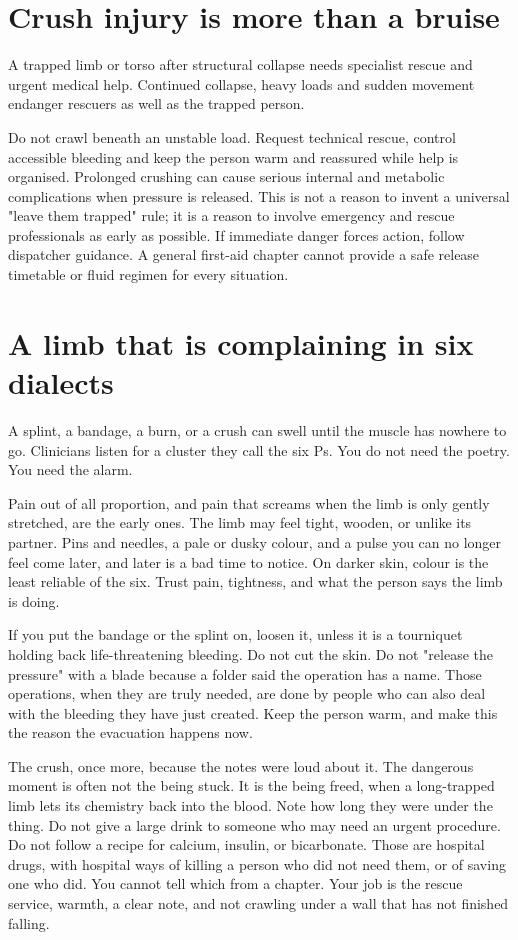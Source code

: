 \documentclass[10pt,openright]{book}
\begin{document}
\section*{Crush injury is more than a bruise}
A trapped limb or torso after structural collapse needs specialist rescue and urgent medical help. Continued collapse, heavy loads and sudden movement endanger rescuers as well as the trapped person.

Do not crawl beneath an unstable load. Request technical rescue, control accessible bleeding and keep the person warm and reassured while help is organised. Prolonged crushing can cause serious internal and metabolic complications when pressure is released. This is not a reason to invent a universal "leave them trapped" rule; it is a reason to involve emergency and rescue professionals as early as possible. If immediate danger forces action, follow dispatcher guidance. A general first-aid chapter cannot provide a safe release timetable or fluid regimen for every situation.

\section*{A limb that is complaining in six dialects}
A splint, a bandage, a burn, or a crush can swell until the muscle has nowhere to go. Clinicians listen for a cluster they call the six Ps. You do not need the poetry. You need the alarm.

Pain out of all proportion, and pain that screams when the limb is only gently stretched, are the early ones. The limb may feel tight, wooden, or unlike its partner. Pins and needles, a pale or dusky colour, and a pulse you can no longer feel come later, and later is a bad time to notice. On darker skin, colour is the least reliable of the six. Trust pain, tightness, and what the person says the limb is doing.

If you put the bandage or the splint on, loosen it, unless it is a tourniquet holding back life-threatening bleeding. Do not cut the skin. Do not "release the pressure" with a blade because a folder said the operation has a name. Those operations, when they are truly needed, are done by people who can also deal with the bleeding they have just created. Keep the person warm, and make this the reason the evacuation happens now.

The crush, once more, because the notes were loud about it. The dangerous moment is often not the being stuck. It is the being freed, when a long-trapped limb lets its chemistry back into the blood. Note how long they were under the thing. Do not give a large drink to someone who may need an urgent procedure. Do not follow a recipe for calcium, insulin, or bicarbonate. Those are hospital drugs, with hospital ways of killing a person who did not need them, or of saving one who did. You cannot tell which from a chapter. Your job is the rescue service, warmth, a clear note, and not crawling under a wall that has not finished falling.
\end{document}
